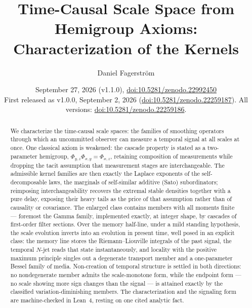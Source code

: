 \documentclass[11pt]{article}
\title{Time-Causal Scale Space from Hemigroup Axioms:\\
Characterization of the Kernels}
\author{Daniel Fagerstr\"om}
\date{September 27, 2026 (v1.1.0),
  \href{https://doi.org/10.5281/zenodo.22992450}{doi:10.5281/zenodo.22992450}\\[3pt]
  {\normalsize First released as v1.0.0, September 2, 2026
  (\href{https://doi.org/10.5281/zenodo.22259187}{doi:10.5281/zenodo.22259187}).
  All versions: \href{https://doi.org/10.5281/zenodo.22259186}{doi:10.5281/zenodo.22259186}.}}
\theoremstyle{plain}
\theoremstyle{definition}
\theoremstyle{remark}
\begin{document}
\maketitle

\begin{abstract}
We characterize the time-causal scale spaces: the families of smoothing operators through
which an uncommitted observer can measure a temporal signal at all scales at once. One
classical axiom is weakened: the cascade property is stated as a two-parameter hemigroup,
$\Phi_{y,z}\Phi_{x,y} = \Phi_{x,z}$, retaining composition of measurements while dropping
the tacit assumption that measurement stages are interchangeable. The admissible kernel
families are then exactly the Laplace exponents of the self-decomposable laws, the
marginals of self-similar additive (Sato) subordinators; reimposing interchangeability
recovers the extremal stable densities together with a pure delay, exposing their heavy
tails as the price of that assumption rather than of causality or covariance. The enlarged
class contains members with all moments finite --- foremost the Gamma family, implemented
exactly, at integer shape, by cascades of first-order filter sections. Over the memory half-line, under a
mild standing hypothesis, the scale evolution inverts into an evolution in present time,
well posed in an explicit class: the memory line stores the
Riemann--Liouville integrals of the past signal, the temporal $N$-jet reads that state
instantaneously, and locality with the positive maximum principle singles out a
degenerate transport member and a one-parameter Bessel family of media. Non-creation of temporal structure is settled in
both directions: no nondegenerate member admits the scale-monotone form, while the
endpoint form --- no scale showing more sign changes than the signal --- is attained
exactly by the classified variation-diminishing members. The characterization and the
signaling form are machine-checked in Lean~4, resting on one cited analytic fact.
\end{abstract}















\appendix







\end{document}
